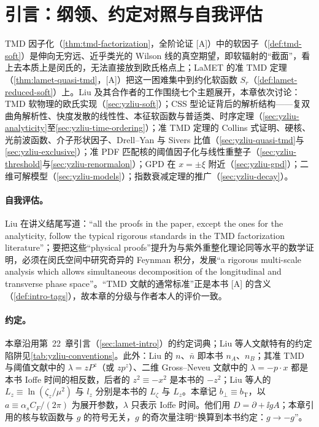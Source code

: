 \section{引言：纲领、约定对照与自我评估}\label{sec:yzliu-intro}

TMD 因子化（\cref{thm:tmd-factorization}，全阶论证 [A]）中的软因子（\cref{def:tmd-soft}）是伸向无穷远、近乎类光的 Wilson 线的真空期望，即软辐射的“截面”，看上去本质上是闵氏的，无法直接放到欧氏格点上；LaMET 的准 TMD 定理（\cref{thm:lamet-quasi-tmd}，[A]）把这一困难集中到约化软函数 $S_r$（\cref{def:lamet-reduced-soft}）上。Liu 及其合作者的工作围绕七个主题展开，本章依次讨论：TMD 软物理的欧氏实现（\cref{sec:yzliu-soft}）；CSS 型论证背后的解析结构——复双曲角解析性、快度发散的线性性、本征软函数与普适类、时序定理（\cref{sec:yzliu-analyticity}至\cref{sec:yzliu-time-ordering}）；准 TMD 定理的 Collins 式证明、硬核、光前波函数、介子形状因子、Drell--Yan 与 Sivers 比值（\cref{sec:yzliu-quasi-tmd}与\cref{sec:yzliu-exclusive}）；准 PDF 匹配核的阈值因子化与线性重整子（\cref{sec:yzliu-threshold}与\cref{sec:yzliu-renormalon}）；GPD 在 $x=\pm\xi$ 附近（\cref{sec:yzliu-gpd}）；二维可解模型（\cref{sec:yzliu-models}）；指数衰减定理的推广（\cref{sec:yzliu-decay}）。

\paragraph{自我评估。}Liu 在讲义结尾写道：“all the proofs in the paper, except the ones for the analyticity, follow the typical rigorous standards in the TMD factorization literature”\cite[第~6~节]{Liu:2022nnk}；要把这些“physical proofs”提升为与紫外重整化理论同等水平的数学证明，必须在闵氏空间中研究奇异的 Feynman 积分，发展“a rigorous multi-scale analysis which allows simultaneous decomposition of the longitudinal and transverse phase space”。“TMD 文献的通常标准”正是本书 [A] 的含义（\cref{def:intro-tags}），故本章的分级与作者本人的评价一致。

\paragraph{约定。}本章沿用第~22~章引言（\cref{sec:lamet-intro}）的约定词典；Liu 等人文献特有的约定陷阱见\cref{tab:yzliu-conventions}。此外：Liu 的 $n$、$\bar n$ 即本书 $n_A$、$n_B$；其准 TMD 与阈值文献中的 $\lambda=zP^z$（或 $zp^z$）、二维 Gross--Neveu 文献中的 $\lambda=-p\cdot x$ 都是本书 Ioffe 时间的相反数，后者的 $z^2\equiv-x^2$ 是本书的 $-z^2$；Liu 等人的 $L_z\equiv\ln(\zeta_z/\mu^2)$ 与 $l_z$ 分别是本书的 $L_\zeta$ 与 $L_z$。本章记 $b_\perp\equiv b_{\mathrm T}$，以 $a\equiv\alpha_sC_F/(2\pi)$ 为展开参数，$\lambda$ 只表示 Ioffe 时间。他们用 $D=\partial+\ii gA$；本章引用的核与软函数与 $g$ 的符号无关，$g$ 的奇次量注明“换算到本书约定：$g\to-g$”。

